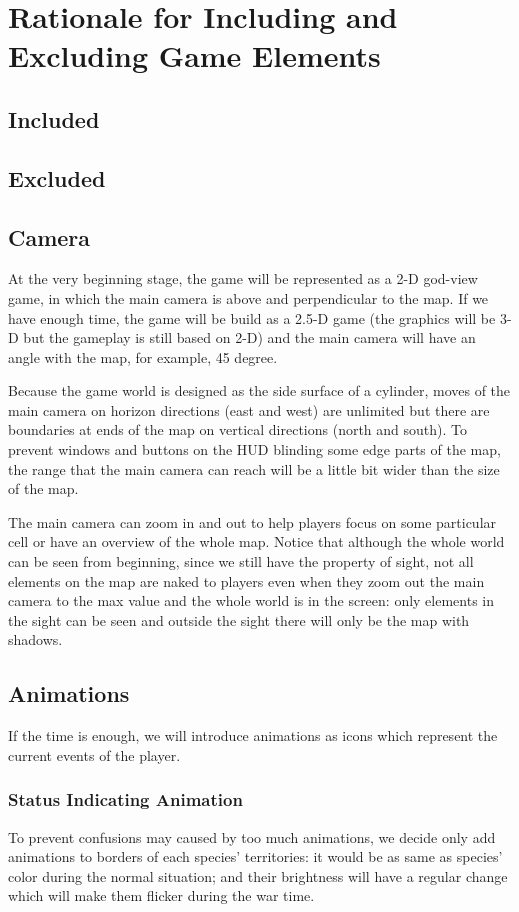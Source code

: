 \section{Rationale for Including and Excluding Game Elements}

\subsection{Included}
\subsection{Excluded}


\subsection{Camera}
At the very beginning stage, the game will be represented as a 2-D god-view game, in which the main camera is above and perpendicular to the map. If we have enough time, the game will be build as a 2.5-D game (the graphics will be 3-D but the gameplay is still based on 2-D) and the main camera will have an angle with the map, for example, 45 degree. 

Because the game world is designed as the side surface of a cylinder, moves of the main camera on horizon directions (east and west) are unlimited but there are boundaries at ends of the map on vertical directions (north and south). To prevent windows and buttons on the HUD blinding some edge parts of the map, the range that the main camera can reach will be a little bit wider than the size of the map.

The main camera can zoom in and out to help players focus on some particular cell or have an overview of the whole map. Notice that although the whole world can be seen from beginning, since we still have the property of sight, not all elements on the map are naked to players even when they zoom out the main camera to the max value and the whole world is in the screen: only elements in the sight can be seen and outside the sight there will only be the map with shadows.

\subsection{Animations}
If the time is enough, we will introduce animations as icons which represent the current events of the player.
\subsubsection{Status Indicating Animation}
To prevent confusions may caused by too much animations, we decide only add animations to borders of each species' territories: it would be as same as species' color during the normal situation; and their brightness will have a regular change which will make them flicker during the war time.

